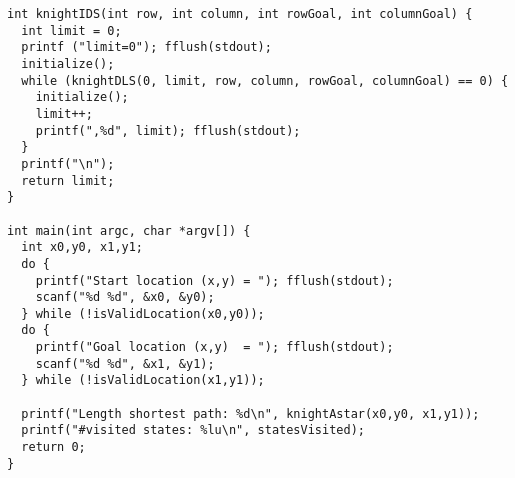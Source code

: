 \documentclass{article}
\begin{document}
\begin{lstlisting}
int knightIDS(int row, int column, int rowGoal, int columnGoal) {
  int limit = 0;
  printf ("limit=0"); fflush(stdout);
  initialize();
  while (knightDLS(0, limit, row, column, rowGoal, columnGoal) == 0) {
    initialize();
    limit++;
    printf(",%d", limit); fflush(stdout);
  }
  printf("\n");
  return limit;
}

int main(int argc, char *argv[]) {
  int x0,y0, x1,y1;
  do {
    printf("Start location (x,y) = "); fflush(stdout);
    scanf("%d %d", &x0, &y0);
  } while (!isValidLocation(x0,y0));
  do {
    printf("Goal location (x,y)  = "); fflush(stdout);
    scanf("%d %d", &x1, &y1);
  } while (!isValidLocation(x1,y1));

  printf("Length shortest path: %d\n", knightAstar(x0,y0, x1,y1));
  printf("#visited states: %lu\n", statesVisited);
  return 0;
}
\end{lstlisting}
\end{document}
